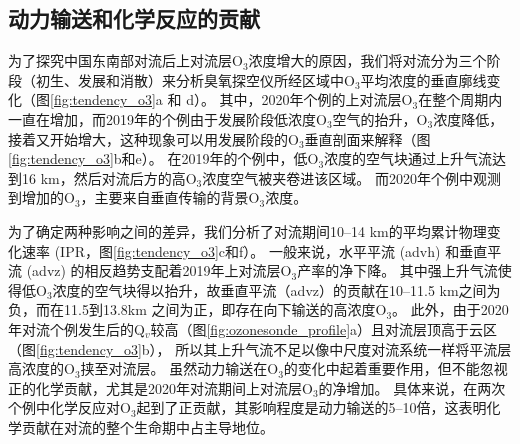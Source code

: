 \subsection{动力输送和化学反应的贡献} \label{sec:convec_impacts}

为了探究中国东南部对流后上对流层O$_3$浓度增大的原因，我们将对流分为三个阶段（初生、发展和消散）来分析臭氧探空仪所经区域中O$_3$平均浓度的垂直廓线变化（图\ref{fig:tendency_o3}a 和 d）。
其中，2020年个例的上对流层O$_3$在整个周期内一直在增加，而2019年的个例由于发展阶段低浓度O$_3$空气的抬升，O$_3$浓度降低，接着又开始增大，这种现象可以用发展阶段的O$_3$垂直剖面来解释（图\ref{fig:tendency_o3}b和e）。
在2019年的个例中，低O$_3$浓度的空气块通过上升气流达到16 km，然后对流后方的高O$_3$浓度空气被夹卷进该区域。
而2020年个例中观测到增加的O$_3$，主要来自垂直传输的背景O$_3$浓度。

为了确定两种影响之间的差异，我们分析了对流期间10--14 km的平均累计物理变化速率 (IPR，图\ref{fig:tendency_o3}c和f）。
一般来说，水平平流 (advh) 和垂直平流 (advz) 的相反趋势支配着2019年上对流层O$_3$产率的净下降。
其中强上升气流使得低O$_3$浓度的空气块得以抬升，故垂直平流（advz）的贡献在10--11.5 km之间为负，而在11.5到13.8km 之间为正，即存在向下输送的高浓度O$_3$。
此外，由于2020年对流个例发生后的Q$_v$较高（图\ref{fig:ozonesonde_profile}a）且对流层顶高于云区（图\ref{fig:tendency_o3}b），
所以其上升气流不足以像中尺度对流系统一样将平流层高浓度的O$_3$挟至对流层\citep{Phoenix.2020}。
虽然动力输送在O$_3$的变化中起着重要作用，但不能忽视正的化学贡献，尤其是2020年对流期间上对流层O$_3$的净增加。
具体来说，在两次个例中化学反应对O$_3$起到了正贡献，其影响程度是动力输送的5--10倍，这表明化学贡献在对流的整个生命期中占主导地位。


